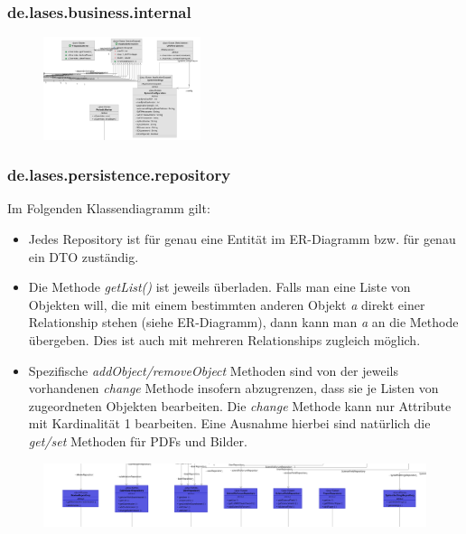 \subsubsection{de.lases.business.internal}

\begin{figure}[H]
	\centering
	\includegraphics[height=3cm]{graphics/business_internal}
\end{figure}


\subsubsection{de.lases.persistence.repository}

Im Folgenden Klassendiagramm gilt:
\begin{itemize}
	\item Jedes Repository ist für genau eine Entität im ER-Diagramm bzw. für genau ein DTO zuständig.
	\item Die Methode \emph{getList()} ist jeweils überladen. Falls man eine Liste von Objekten will, die mit einem bestimmten anderen Objekt \emph{a} direkt einer Relationship stehen (siehe ER-Diagramm), dann kann man \emph{a} an die Methode übergeben. Dies ist auch mit mehreren Relationships zugleich möglich.
	\item Spezifische \emph{addObject/removeObject} Methoden sind von der jeweils vorhandenen \emph{change} Methode insofern abzugrenzen, dass sie je Listen von zugeordneten Objekten bearbeiten. Die \emph{change} Methode kann nur Attribute mit Kardinalität 1 bearbeiten. Eine Ausnahme hierbei sind natürlich die \emph{get/set} Methoden für PDFs und Bilder.
\end{itemize}

\begin{figure}[H]
	\centering
	\includegraphics[width=0.9\linewidth]{graphics/persistence_repository}
\end{figure}

